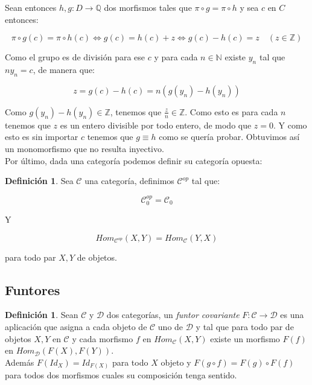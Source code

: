 \documentclass{article}
\newcommand{\nat}{\ensuremath{\mathbb{N}}}
\newcommand{\ent}{\ensuremath{\mathds{Z}}}
\newcommand{\Q}{\ensuremath{\mathbb{Q}}}
\newcommand{\Z}{\ensuremath{\mathds{Z}}}
\theoremstyle{plain}
\theoremstyle{definition}
\newtheorem{definition}[theorem]{Definición}
\theoremstyle{remark}
\begin{document}
Sean entonces $h,g:D \to \Q$ dos morfismos tales que $\pi \circ g = \pi \circ h$ y sea $c$ en $C$ entonces:

\begin{equation*}
    \pi \circ g(c) = \pi \circ h (c) \iff g(c) = h(c) + z \iff g(c) - h(c) = z \quad (z \in \ent)
\end{equation*}

Como el grupo es de división para ese $c$ y para cada $n \in \nat$ existe $y_n$ tal que $ny_n = c$, de manera que:

\begin{equation*}
   z = g(c) - h(c) = n(g(y_n) - h(y_n)) 
\end{equation*}


Como $g(y_n) - h(y_n) \in \mathbb{Z}$, tenemos que $\frac{z}{n} \in \Z$. Como esto es para cada $n$ tenemos que $z$ es un entero divisible por todo entero, de modo que $z = 0$. Y como esto es sin importar $c$ tenemos que $g \equiv h$ como se quería probar. Obtuvimos así un monomorfismo que no resulta inyectivo. \\

Por último, dada una categoría podemos definir su categoría opuesta:

\begin{definition}
    Sea $\mathcal{C}$ una categoría, definimos $\mathcal{C}^{op}$ tal que:

    \begin{equation*}
        \mathcal{C}_0^{op} = \mathcal{C}_0
    \end{equation*}

    Y

    \begin{equation*}
        Hom_{\mathcal{C}^{op}}(X,Y) = Hom_{\mathcal{C}}(Y,X)
    \end{equation*}

    para todo par $X,Y$ de objetos.
\end{definition}

\subsection{Funtores}

\begin{definition}
    Sean $\mathcal{C}$ y $\mathcal{D}$ dos categorías, un \textit{funtor covariante} $F: \mathcal{C}  \to \mathcal{D}$ es una aplicación que asigna a cada objeto de $\mathcal{C}$ uno de $\mathcal{D}$ y tal que para todo par de objetos $X,Y$ en $\mathcal{C}$ y cada morfismo $f$ en $Hom_{\mathcal{C}}(X,Y)$ existe un morfismo $F(f)$ en $Hom_{\mathcal{D}}(F(X),F(Y))$. \\

    Además $F(Id_{X}) = Id_{F(X)}$ para todo $X$ objeto y $F(g \circ f) = F(g) \circ F(f)$ para todos dos morfismos cuales su composición tenga sentido.
\end{definition}
\end{document}
